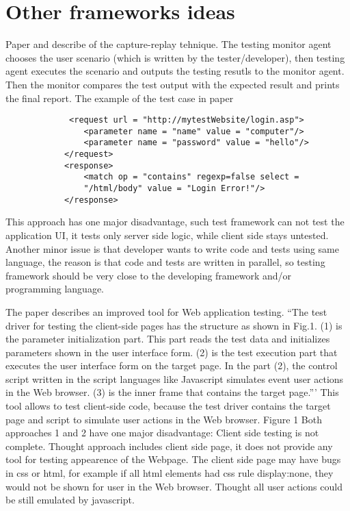   \section {Other frameworks ideas}
   		Paper \cite{Xu1} and \cite{Zhongen2} describe of the capture-replay
   		tehnique.
   		The testing monitor agent chooses the user scenario (which is written by the tester/developer),
   		 then testing agent executes the scenario and outputs the testing
   		 resutls to the monitor agent. Then the monitor compares the test output
   		 with the expected result and prints the final report. The example of the
   		 test case in paper \cite{Zhongen2}
   		 \lstset{language=XML}
   		 \begin{lstlisting}
			 <request url = "http://mytestWebsite/login.asp"> 
			 	<parameter name = "name" value = "computer"/> 
			 	<parameter name = "password" value = "hello"/> 
			</request> 
			<response> 
			 	<match op = "contains" regexp=false select = 
			 	"/html/body" value = "Login Error!"/> 
			</response> 
   		\end{lstlisting}	
		This approach has one major disadvantage, such test framework can not test
		the application UI, it tests only server side logic, while client
		side stays untested. Another minor issue is that developer wants to write
		code and tests using same language, the reason is that code and tests are
		written in parallel, so testing framework should be very close to the
		developing framework and/or programming language.
		
		The paper \cite{testGen3} describes an improved tool for Web application testing. 
			``The test driver for testing the client-side pages has the structure as
			shown in Fig.1. (1)  is the parameter initialization part. This part reads the test data and 
		 initializes parameters shown in the  user interface form. (2) is the test 
		 execution part that executes the  user interface form on the target 
		 page. In the part (2), the control  script written in the script 
		 languages like Javascript simulates event user actions in the Web browser. (3) is the inner frame 
		 that contains the target page.'''
		  This tool allows to test client-side code, because the test driver
		  contains the target page and script to simulate user actions in the
		  Web browser. 
		  				Figure 1
		Both approaches 1 and 2 have one major disadvantage:
			Client side testing is not complete. Thought approach includes client side
			page, it does not provide any tool for testing appearence of the Webpage. The
			client side page may have bugs in css or html, for example if all html
			elements had css rule display:none, they would not be shown for user in the
			Web browser. Thought all user actions could be still emulated by javascript.
